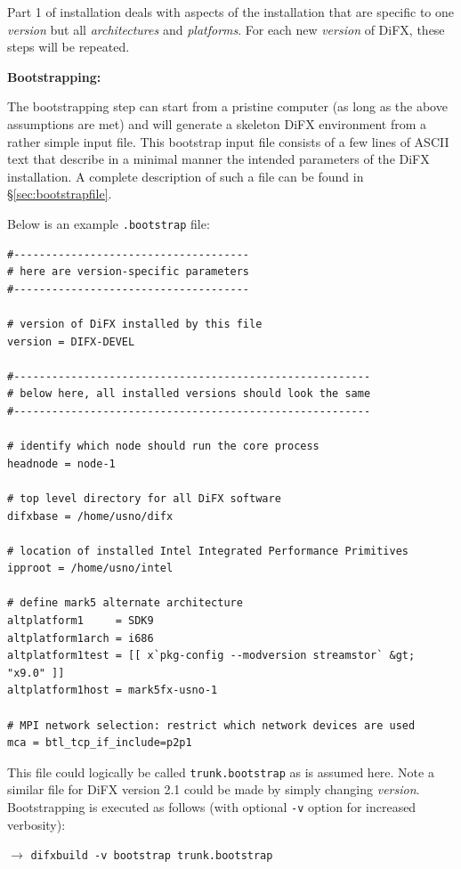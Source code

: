 Part 1 of installation deals with aspects of the installation that are specific to one {\em version} but all {\em architectures} and {\em platforms}.
For each new {\em version} of DiFX, these steps will be repeated.

\vspace{10pt}
\noindent
{\bf Bootstrapping:}

The bootstrapping step can start from a pristine computer (as long as the above assumptions are met) and will generate a skeleton DiFX environment from a rather simple input file.
This bootstrap input file consists of a few lines of ASCII text that describe in a minimal manner 
the intended parameters of the DiFX installation.
A complete description of such a file can be found in \S\ref{sec:bootstrapfile}.

Below is an example {\tt .bootstrap} file:

\begin{verbatim}
#-------------------------------------
# here are version-specific parameters
#-------------------------------------

# version of DiFX installed by this file
version = DIFX-DEVEL

#--------------------------------------------------------
# below here, all installed versions should look the same
#--------------------------------------------------------

# identify which node should run the core process
headnode = node-1

# top level directory for all DiFX software
difxbase = /home/usno/difx

# location of installed Intel Integrated Performance Primitives
ipproot = /home/usno/intel

# define mark5 alternate architecture
altplatform1     = SDK9
altplatform1arch = i686
altplatform1test = [[ x`pkg-config --modversion streamstor` &gt; "x9.0" ]]
altplatform1host = mark5fx-usno-1

# MPI network selection: restrict which network devices are used
mca = btl_tcp_if_include=p2p1
\end{verbatim}

This file could logically be called {\tt trunk.bootstrap} as is assumed here.
Note a similar file for DiFX version 2.1 could be made by simply changing {\em version}.
Bootstrapping is executed as follows (with optional {\tt -v} option for increased verbosity):

$\longrightarrow$ {\tt difxbuild -v bootstrap trunk.bootstrap}

